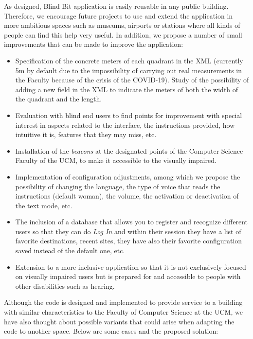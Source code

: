 As designed, Blind Bit application is easily reusable in any public building. Therefore, we encourage future projects to use and extend the application in more ambitious spaces such as museums, airports or stations where all kinds of people can find this help very useful. In addition, we propose a number of small improvements that can be made to improve the application:
\begin{itemize}
	\item Specification of the concrete meters of each quadrant in the XML (currently 5m by default due to the impossibility of carrying out real measurements in the Faculty because of the crisis of the COVID-19). Study of the possibility of adding a new field in the XML to indicate the meters of both the width of the quadrant and the length.
	\item Evaluation with blind end users to find points for improvement with special interest in aspects related to the interface, the instructions provided, how intuitive it is, features that they may miss, etc.
	\item Installation of the \textit{beacons} at the designated points of the Computer Science Faculty of the UCM, to make it accessible to the visually impaired.
	\item Implementation of configuration adjustments, among which we propose the possibility of changing the language, the type of voice that reads the instructions (default woman), the volume, the activation or deactivation of the text mode, etc.
	
	\item The inclusion of a database that allows you to register and recognize different users so that they can do \textit{Log In} and within their session they have a list of favorite destinations, recent sites, they have also their favorite configuration saved instead of the default one, etc.
	
	\item Extension to a more inclusive application so that it is not exclusively focused on visually impaired users but is prepared for and accessible to people with other disabilities such as hearing.
	
\end{itemize}
	
Although the code is designed and implemented to provide service to a building with similar characteristics to the Faculty of Computer Science at the UCM, we have also thought about possible variants that could arise when adapting the code to another space. Below are some cases and the proposed solution: 
	
